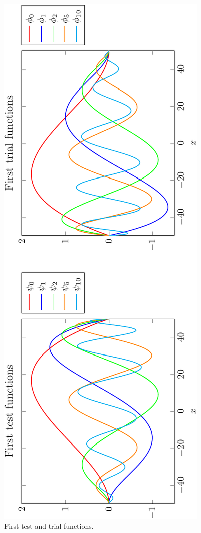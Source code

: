 \begin{center}
\begin{figure}[!h]
\includegraphics[scale=0.6,angle=270]{images/plotbasis2.pdf}
\caption{First test and trial functions.}
\label{basisfunctions}
\end{figure}
\end{center}


